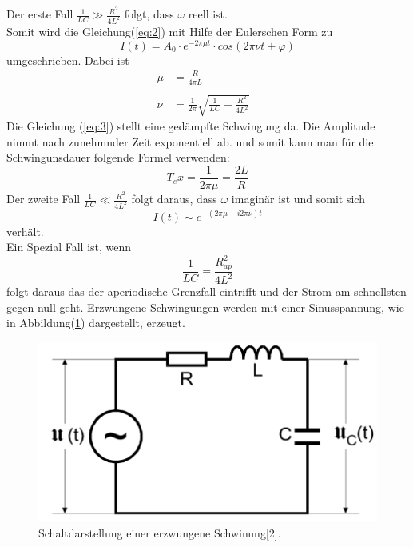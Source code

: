 Der erste Fall $\frac{1}{LC} \gg \frac{R^2}{4L^2}$ folgt, dass $\omega$ reell ist.\\
Somit wird die Gleichung(\ref{eq:2}) mit Hilfe der Eulerschen Form zu
\begin{equation}
  I(t) = A_0 \cdot e^{-2\pi\mu t} \cdot cos(2\pi\nu t + \varphi)
  \label{eq:3}
\end{equation}
umgeschrieben. Dabei ist
\begin{align*}
    \mu &= \frac{R}{4\pi L}& \\\\
    \nu &= \frac{1}{2\pi} \sqrt{\frac{1}{LC} - \frac{R^2}{4L^2}}&
\end{align*}
Die Gleichung (\ref{eq:3}) stellt eine gedämpfte Schwingung da. Die Amplitude nimmt nach zunehmnder Zeit exponentiell ab.
und somit kann man für die Schwingunsdauer folgende Formel verwenden:
\begin{equation}
  T_ex = \frac{1}{2\pi \mu} = \frac{2L}{R}
  \label{eq:4}
\end{equation}
Der zweite Fall $\frac{1}{LC} \ll \frac{R^2}{4L^2}$ folgt daraus, dass $\omega$ imaginär ist
und somit sich
\begin{equation*}
I(t) \sim e^{-(2\pi \mu - i 2 \pi \nu)t}
\end{equation*} verhält.\\
Ein Spezial Fall ist, wenn
\begin{equation}
\frac{1}{LC} = \frac{R_{ap}^2}{4L^2}
\label{eq:5}
\end{equation}
folgt daraus das der aperiodische Grenzfall eintrifft und der Strom am schnellsten gegen null geht.
\newpage
Erzwungene Schwingungen werden mit einer Sinusspannung, wie in Abbildung(\ref{fig:2}) dargestellt, erzeugt.
\begin{figure}[H]
\centering
\includegraphics[width=10 cm, height= 7 cm]{Schwingkreis2.png}
\caption{Schaltdarstellung einer erzwungene Schwinung[2].}
\label{fig:2}
\end{figure}


